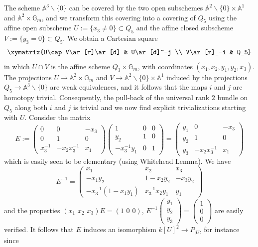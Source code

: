 \documentclass[11pt,leqno]{article}
\newcommand{\A}{{\mathbb A}}
\renewcommand{\1}{{\rm 1\hspace*{-0.4ex}%
\rule{0.1ex}{1.52ex}\hspace*{0.2ex}}}
\newcommand{\gm}{{{\mathbb G}_{m}}}
\newcommand{\<}[1]{{\langle}#1 {\rangle}}
\theoremstyle{plain}
\theoremstyle{definition}
\theoremstyle{remark}
\numberwithin{equation}{section}
\begin{document}
The scheme $\A^3\smallsetminus\{0\}$ can be covered by the two open subschemes $\A^2\smallsetminus\{0\}\times \A^1$ and $\A^2\times \gm{}$, and we transform this covering into a covering of $Q_5$ using the affine open subscheme $U:=\{x_3\neq 0\}\subset Q_5$ and the affine closed subscheme $V:=\{y_3=0\}\subset Q_5$. We obtain a Cartesian square 
\begin{equation}\label{eqn:homotopycartesianQ5}
\xymatrix{U\cap V\ar[r]\ar[d] & U\ar[d]^-j \\
V\ar[r]_-i & Q_5}
\end{equation}
in which $U\cap V$ is the affine scheme $Q_3\times \gm$, with coordinates $(x_1,x_2,y_1,y_2,x_3)$. The projections $U\to \A^2\times \gm{}$ and $V\to \A^2\smallsetminus\{0\}\times \A^1$ induced by the projections $Q_5\to \A^3\smallsetminus\{0\}$ are weak equivalences, and it follows that the maps $i$ and $j$ are homotopy trivial. Consequently, the pull-back of the universal rank $2$ bundle on $Q_5$ along both $i$ and $j$ is trivial and we now find explicit trivializations starting with $U$. Consider the matrix
\[
E:=\begin{pmatrix} 0 & 0 & -x_3 \\ 0 & 1 & 0 \\ x_3^{-1} & -x_2x_3^{-1} & x_1\end{pmatrix}\begin{pmatrix} 1 & 0 & 0 \\ y_2 & 1 & 0 \\ -x_3^{-1}y_1 & 0 & 1\end{pmatrix}=\begin{pmatrix} y_1 & 0 & -x_3 \\ y_2 & 1 & 0 \\ y_3 & -x_2x_3^{-1} & x_1 \end{pmatrix}
\]
which is easily seen to be elementary (using Whitehead Lemma). We have 
\[
E^{-1}=\begin{pmatrix} x_1 & x_ 2 & x_3 \\ -x_1y_2 & 1-x_2y_2 & -x_3y_2 \\ -x_3^{-1}(1-x_1y_1) & x_3^{-1}x_2y_1 & y_1\end{pmatrix}
\]
and the properties $(x_1\phantom{i}x_2\phantom{i}x_3)E=(1\phantom{i}0\phantom{i}0)$, $E^{-1}\begin{pmatrix} y_1 \\ y_2 \\y_3\end{pmatrix}=\begin{pmatrix} 1 \\ 0 \\0\end{pmatrix}$ are easily verified. It follows that $E$ induces an isomorphism $k[U]^2\to P_{\vert U}$, for instance since
\end{document}
